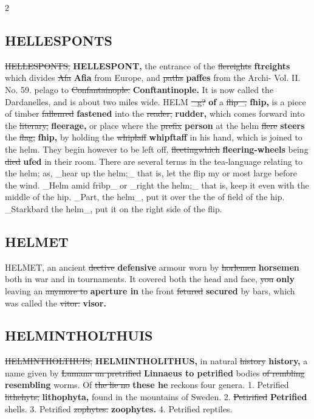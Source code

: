 \documentclass[10pt]{article}
\begin{document}
\begin{multicols}{2}
\subsection*{HELLESPONTS}
\sout{HELLESPONTS,} \textbf{HELLESPONT,} the entrance of the \sout{flereights} \textbf{ftreights} which divides \sout{Afa} \textbf{Afia} from Europe, and \sout{paths} \textbf{paffes} from the Archi- Vol. II. No. 59. pelago to \sout{Confantainople.} \textbf{Conftantinople.} It is now called the Dardanelles, and is about two miles wide. HELM \sout{\_g?} \textbf{of} a \sout{flip\_,} \textbf{fhip,} is a piece of timber \sout{fallenred} \textbf{fastened} into the \sout{reader,} \textbf{rudder,} which comes forward into the \sout{literary,} \textbf{fleerage,} or place where the \sout{prefix} \textbf{person} at the helm \sout{flere} \textbf{steers} the \sout{flag,} \textbf{fhip,} by holding the \sout{whiplaff} \textbf{whipftaff} in his hand, which is joined to the helm. They begin however to be left off, \sout{fleetingwhich} \textbf{fleering-wheels} being \sout{died} \textbf{ufed} in their room. There are several terms in the tea-language relating to the helm; as, \_hear up the helm;\_ that is, let the flip my or most large before the wind. \_Helm amid fribp\_ or \_right the helm;\_ that is, keep it even with the middle of the hip. \_Part, the helm\_, put it over the the of field of the hip. \_Starkbard the helm\_, put it on the right side of the flip.

\subsection*{HELMET}
HELMET, an ancient \sout{dective} \textbf{defensive} armour worn by \sout{horlemen} \textbf{horsemen} both in war and in tournaments. It covered both the head and face, \sout{you} \textbf{only} leaving an \sout{anymore to} \textbf{aperture in} the front \sout{fetured} \textbf{secured} by bars, which was called the \sout{vitor.} \textbf{visor.}

\subsection*{HELMINTHOLTHUIS}
\sout{HELMINTHOLTHUIS,} \textbf{HELMINTHOLITHUS,} in natural \sout{history} \textbf{history,} a name given by \sout{Lumana un pretrified} \textbf{Linnaeus to petrified} bodies \sout{of rembling} \textbf{resembling} worms. Of \sout{the lie no} \textbf{these he} reckons four genera. 1. Petrified \sout{lithehyts,} \textbf{lithophyta,} found in the mountains of Sweden. 2. \sout{Petirified} \textbf{Petrified} shells. 3. Petrified \sout{zophytes.} \textbf{zoophytes.} 4. Petrified reptiles.


\end{multicols}
\end{document}
